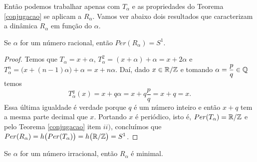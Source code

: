 Então podemos trabalhar apenas com $T_{\alpha}$ e as propriedades do Teorema \ref{conjugacao} se aplicam a $R_{\alpha}$. Vamos ver abaixo dois resultados que caracterizam a dinâmica $R_{\alpha}$ em função do $\alpha$.

\begin{proposicao} Se $\alpha$ for um número racional, então $Per(R_{\alpha})=S^1$.
\end{proposicao}

\begin{proof} Temos que $T_{\alpha}=x+\alpha$, $T_{\alpha}^2=(x+\alpha)+\alpha=x+2\alpha$ e $T_{\alpha}^n=\big(x+(n-1)\alpha\big)+\alpha=x+n\alpha$. Daí, dado $x\in\mathbb{R}/\mathbb{Z}$ e tomando $\alpha=\dfrac{p}{q}\in\mathbb{Q}$ temos 
$$T_{\alpha}^q(x)=x+q\alpha=x+q\dfrac{p}{q}=x+q=x.$$
Essa última igualdade é verdade porque $q$ é um número inteiro e então $x+q$ tem a mesma parte decimal que $x$. Portando $x$ é periódico, isto é, $Per(T_{\alpha})=\mathbb{R}/\mathbb{Z}$ e pelo Teorema \ref{conjugacao} item $ii)$, concluímos que $Per(R_{\alpha})=h\big(Per(T_{\alpha})\big)=h\big(\mathbb{R}/\mathbb{Z}\big)=S^1$.
\end{proof}

\begin{proposicao}\label{rotacaoirracional} Se $\alpha$ for um número irracional, então $R_{\alpha}$ é minimal.
\end{proposicao}

